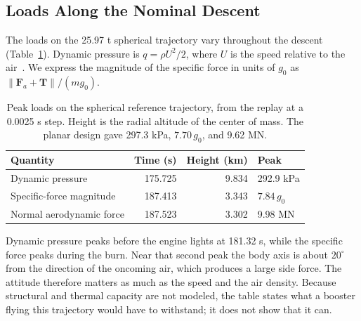 \subsection{Loads Along the Nominal Descent}
\label{sec:flight-exposure}
The loads on the 25.97 t spherical trajectory vary throughout the descent (Table~\ref{tab:flight-exposure}). Dynamic pressure is $q=\rho U^2/2$, where $U$ is the speed relative to the air~\cite{dynamicPressure}. We express the magnitude of the specific force in units of $g_0$ as $\lVert\mathbf F_a+\mathbf T\rVert/(m g_0)$.

\begin{table}[htbp]
\centering
\caption{Peak loads on the spherical reference trajectory, from the replay at a 0.0025 s step. Height is the radial altitude of the center of mass. The planar design gave 297.3 kPa, $7.70\,g_0$, and 9.62 MN.}
\label{tab:flight-exposure}
\begin{tabular}{@{}lrrl@{}}
\toprule
Quantity & Time (s) & Height (km) & Peak \\
\midrule
Dynamic pressure & 175.725 & 9.834 & 292.9 kPa \\
Specific-force magnitude & 187.413 & 3.343 & $7.84\,g_0$ \\
Normal aerodynamic force & 187.523 & 3.302 & 9.98 MN \\
\bottomrule
\end{tabular}
\end{table}

Dynamic pressure peaks before the engine lights at 181.32 s, while the specific force peaks during the burn. Near that second peak the body axis is about $20^\circ$ from the direction of the oncoming air, which produces a large side force. The attitude therefore matters as much as the speed and the air density. Because structural and thermal capacity are not modeled, the table states what a booster flying this trajectory would have to withstand; it does not show that it can.

